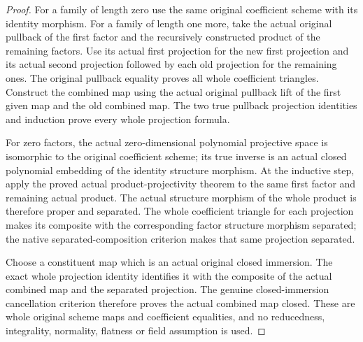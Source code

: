 \begin{proof}
For a family of length zero use the same original coefficient
scheme with its identity morphism. For a family of length one
more, take the actual original pullback of the first factor and
the recursively constructed product of the remaining factors.
Use its actual first projection for the new first projection
and its actual second projection followed by each old projection
for the remaining ones. The original pullback equality proves
all whole coefficient triangles. Construct the combined map
using the actual original pullback lift of the first given map
and the old combined map. The two true pullback projection
identities and induction prove every whole projection formula.

For zero factors, the actual zero-dimensional polynomial
projective space is isomorphic to the original coefficient
scheme; its true inverse is an actual closed polynomial embedding
of the identity structure morphism. At the inductive step, apply the
proved actual product-projectivity theorem to the same first
factor and remaining actual product. The actual structure
morphism of the whole product is therefore proper and separated.
The whole coefficient triangle for each projection makes its
composite with the corresponding factor structure morphism
separated; the native separated-composition criterion makes
that same projection separated.

Choose a constituent map which is an actual original closed
immersion. The exact whole projection identity identifies it
with the composite of the actual combined map and the separated
projection. The genuine closed-immersion cancellation criterion
therefore proves the actual combined map closed. These are
whole original scheme maps and coefficient equalities, and no
reducedness, integrality, normality, flatness or field assumption
is used.
\end{proof}
